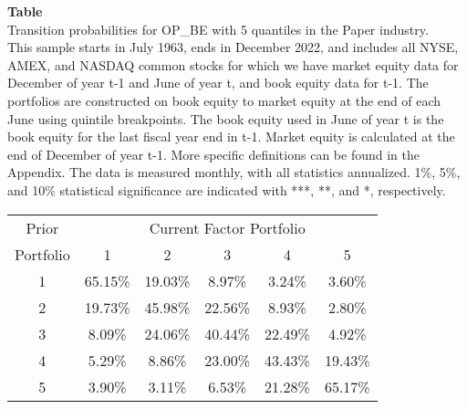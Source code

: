 \begin{table*}[ht!]
\raggedright
{}
\label{tab: transition_probs_OP_BE_Paper_with_5_quantiles}
\textbf{Table \thetable} \\
Transition probabilities for OP_BE with 5 quantiles in the Paper industry. \\
\hspace*{1em}This sample starts in July 1963, ends in December 2022, and includes all NYSE, AMEX, and NASDAQ common stocks for which we have market equity data for December of year t-1 and June of year t, and book equity data for t-1. The portfolios are constructed on book equity to market equity at the end of each June using quintile breakpoints.  The book equity used in June of year t is the book equity for the last fiscal year end in t-1.  Market equity is calculated at the end of December of year t-1.  More specific definitions can be found in the Appendix.  The data is measured monthly, with all statistics annualized.  1\%, 5\%, and 10\% statistical significance are indicated with ***, **, and *, respectively. \\
\vspace{0.5em}
\centering
\begin{adjustbox}{max width=\textwidth}
\begin{tabular}{@{}cccccc@{}}
\toprule
Prior & \multicolumn{5}{c}{Current Factor Portfolio} \\
Portfolio & 1 & 2 & 3 & 4 & 5 \\
\midrule
1 & 65.15\% & 19.03\% & 8.97\% & 3.24\% & 3.60\% \\
2 & 19.73\% & 45.98\% & 22.56\% & 8.93\% & 2.80\% \\
3 & 8.09\% & 24.06\% & 40.44\% & 22.49\% & 4.92\% \\
4 & 5.29\% & 8.86\% & 23.00\% & 43.43\% & 19.43\% \\
5 & 3.90\% & 3.11\% & 6.53\% & 21.28\% & 65.17\% \\
\bottomrule
\end{tabular}
\end{adjustbox}
\end{table*}